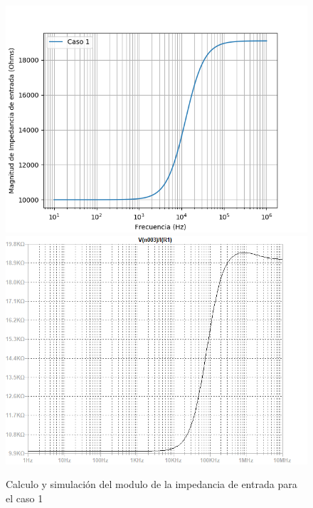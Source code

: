 \begin{figure}[H]
\begin{centering}
\includegraphics[scale=0.5]{../Ex1/iA/Resources1a/zinpm1}\includegraphics[scale=0.4]{../Ex1/iA/Resources1a/zinpm1_sim}
\par\end{centering}
\caption{Calculo y simulación del modulo de la impedancia de entrada para el
caso 1}
\end{figure}

